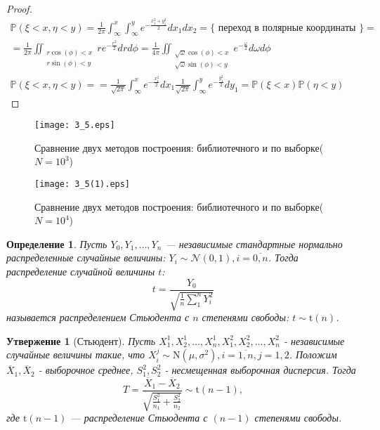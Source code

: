 \documentclass[11pt]{article}
\newtheorem{statement}{Утвержение}[section]
\newtheorem{definition}{Определение}[section]
\begin{document}
\begin{proof}
 

$$
\begin{gathered}
\mathbb{P}(\xi<x, \eta<y)=\frac{1}{2 \pi} \int_{\infty}^x \int_{\infty}^y e^{-\frac{x_1^2+y_1^2}{2}} d x_1 d x_2=\{\text { переход в полярные координаты }\}= \\
=\frac{1}{2 \pi} \iint_{
\begin{array}{c}
r \cos (\phi)<x \\
r \sin (\phi)<y
\end{array}} r e^{-\frac{r^2}{2}} d r d \phi=\frac{1}{4 \pi} \iint_{\substack{\sqrt{\omega} \cos (\phi)<x \\
\sqrt{\omega} \sin (\phi)<y}} e^{-\frac{\omega}{2}} d \omega d \phi \\
\mathbb{P}(\xi<x, \eta<y)==\frac{1}{\sqrt{2 \pi}} \int_{\infty}^x e^{-\frac{x_1^2}{2}} d x_1 \frac{1}{\sqrt{2 \pi}} \int_{\infty}^y e^{-\frac{y_1^2}{2}} d y_1=\mathbb{P}(\xi<x) \mathbb{P}(\eta<y)
\end{gathered}
$$

\end{proof}


\begin{figure}[ht]
    \texttt{[image: 3\_5.eps]} 
    \caption{Сравнение двух методов построения: библиотечного и по выборке($N=10^3$)}
\end{figure} 

\begin{figure}[ht]
    \texttt{[image: 3\_5(1).eps]} 
    \caption{Сравнение двух методов построения: библиотечного и по выборке($N=10^4$)}
\end{figure} 
\FloatBarrier


\begin{definition}
Пусть $Y_0,Y_1,\dots,Y_n$ --- независимые стандартные нормально распределенные случайные величины: $Y_i\sim\mathcal{N}(0,1),i=\overline{0,n}$. Тогда распределение случайной величины $t$:
$$
t = \dfrac{Y_0}{\sqrt{\frac{1}{n}\sum^n_1Y_i^2}}
$$
называется распределением Стьюдента с $n$ степенями свободы: $t\sim \mathrm{t}(n)$.
\end{definition}

\begin{statement}[Стьюдент]
Пусть $X^1_1,X^1_2,\dots,X^1_n, X^2_1,X^2_2,\dots,X^2_n$ - независимые случайные величины такие, что $X^j_i\sim\mathrm{N}(\mu,\sigma^2), i=\overline{1,n}, j=1,2$.
Положим $\overline{X}_1, \overline{X}_2$ - выборочное среднее, $S_1^2, S_2^2$ - несмещенная выборочная дисперсия. Тогда
$$
T=\dfrac{\overline{X}_1-\overline{X}_2}{\sqrt{\frac{S_1^2}{n_1} + \frac{S_2^2}{n_2}}}\sim \mathrm{t}(n-1),
$$
где $\mathrm{t}(n-1)$ --- распределение Стьюдента с $(n-1)$ степенями свободы.
\end{statement}
\end{document}
